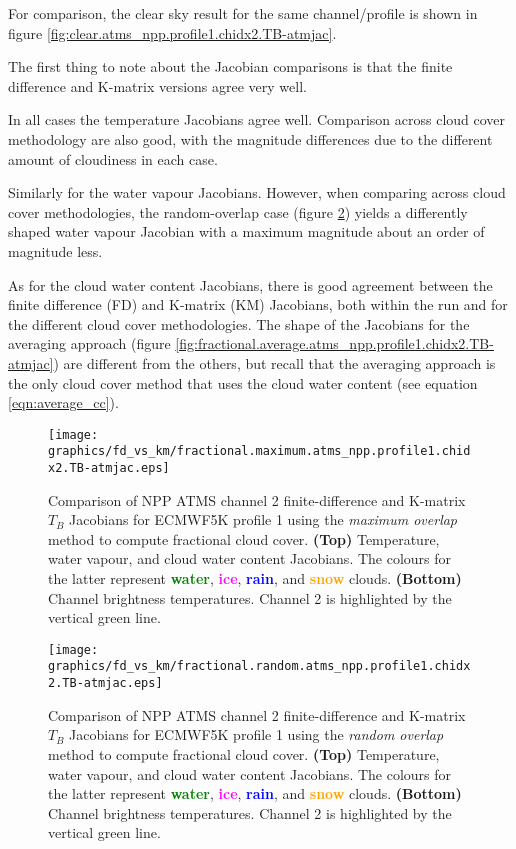 For comparison, the clear sky result for the same channel/profile is shown in figure \ref{fig:clear.atms_npp.profile1.chidx2.TB-atmjac}.

The first thing to note about the Jacobian comparisons is that the finite difference and K-matrix versions agree very well.

In all cases the temperature Jacobians agree well. Comparison across cloud cover methodology are also good, with the magnitude differences due to the different amount of cloudiness in each case.

Similarly for the water vapour Jacobians. However, when comparing across cloud cover methodologies, the random-overlap case (figure \ref{fig:fractional.random.atms_npp.profile1.chidx2.TB-atmjac}) yields a differently shaped water vapour Jacobian with a maximum magnitude about an order of magnitude less.

As for the cloud water content Jacobians, there is good agreement between the finite difference (FD) and K-matrix (KM) Jacobians, both within the run and for the different cloud cover methodologies. The shape of the Jacobians for the averaging approach (figure \ref{fig:fractional.average.atms_npp.profile1.chidx2.TB-atmjac}) are different from the others, but recall that the averaging approach is the only cloud cover method that uses the cloud water content (see equation \ref{eqn:average_cc}).


\begin{figure}[H]
  \caption{Comparison of NPP ATMS channel 2 finite-difference and K-matrix $T_B$ Jacobians for ECMWF5K profile 1 using the \emph{maximum overlap} method to compute fractional cloud cover. \textbf{(Top)} Temperature, water vapour, and cloud water content Jacobians. The colours for the latter represent \textcolor{green}{\textbf{water}}, \textcolor{magenta}{\textbf{ice}}, \textcolor{blue}{\textbf{rain}}, and \textcolor{orange}{\textbf{snow}} clouds. \textbf{(Bottom)} Channel brightness temperatures. Channel 2 is highlighted by the vertical green line.}
  \label{fig:fractional.maximum.atms_npp.profile1.chidx2.TB-atmjac}
  \centering
  \texttt{[image: graphics/fd\_vs\_km/fractional.maximum.atms\_npp.profile1.chidx2.TB-atmjac.eps]}
\end{figure}


\begin{figure}[H]
  \caption{Comparison of NPP ATMS channel 2 finite-difference and K-matrix $T_B$ Jacobians for ECMWF5K profile 1 using the \emph{random overlap} method to compute fractional cloud cover. \textbf{(Top)} Temperature, water vapour, and cloud water content Jacobians. The colours for the latter represent \textcolor{green}{\textbf{water}}, \textcolor{magenta}{\textbf{ice}}, \textcolor{blue}{\textbf{rain}}, and \textcolor{orange}{\textbf{snow}} clouds. \textbf{(Bottom)} Channel brightness temperatures. Channel 2 is highlighted by the vertical green line.}
  \label{fig:fractional.random.atms_npp.profile1.chidx2.TB-atmjac}
  \centering
  \texttt{[image: graphics/fd\_vs\_km/fractional.random.atms\_npp.profile1.chidx2.TB-atmjac.eps]}
\end{figure}


